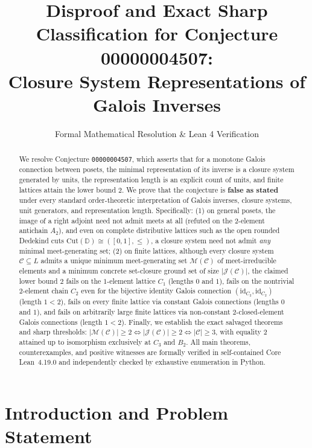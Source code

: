 \documentclass[11pt,a4paper]{article}
\title{\textbf{Disproof and Exact Sharp Classification for Conjecture 00000004507:\\
Closure System Representations of Galois Inverses}}
\author{Formal Mathematical Resolution \& Lean 4 Verification}
\date{}
\theoremstyle{definition}
\theoremstyle{remark}
\begin{document}
\maketitle

\begin{abstract}
We resolve Conjecture \texttt{00000004507}, which asserts that for a monotone Galois connection between posets, the minimal representation of its inverse is a closure system generated by units, the representation length is an explicit count of units, and finite lattices attain the lower bound $2$. We prove that the conjecture is \textbf{false as stated} under every standard order-theoretic interpretation of Galois inverses, closure systems, unit generators, and representation length. Specifically: (1) on general posets, the image of a right adjoint need not admit meets at all (refuted on the $2$-element antichain $A_2$), and even on complete distributive lattices such as the open rounded Dedekind cuts $\mathrm{Cut}(\mathbb{D}) \cong ([0,1], \le)$, a closure system need not admit \emph{any} minimal meet-generating set; (2) on finite lattices, although every closure system $\mathcal{C} \subseteq L$ admits a unique minimum meet-generating set $\mathcal{M}(\mathcal{C})$ of meet-irreducible elements and a minimum concrete set-closure ground set of size $|\mathcal{J}(\mathcal{C})|$, the claimed lower bound $2$ fails on the $1$-element lattice $C_1$ (lengths $0$ and $1$), fails on the nontrivial $2$-element chain $C_2$ even for the bijective identity Galois connection $(\mathrm{id}_{C_2}, \mathrm{id}_{C_2})$ (length $1 < 2$), fails on every finite lattice via constant Galois connections (lengths $0$ and $1$), and fails on arbitrarily large finite lattices via non-constant $2$-closed-element Galois connections (length $1 < 2$). Finally, we establish the exact salvaged theorems and sharp thresholds: $|\mathcal{M}(\mathcal{C})| \ge 2 \iff |\mathcal{J}(\mathcal{C})| \ge 2 \iff |\mathcal{C}| \ge 3$, with equality $2$ attained up to isomorphism exclusively at $C_3$ and $B_2$. All main theorems, counterexamples, and positive witnesses are formally verified in self-contained Core Lean~4.19.0 and independently checked by exhaustive enumeration in Python.
\end{abstract}

\section{Introduction and Problem Statement}
\end{document}
